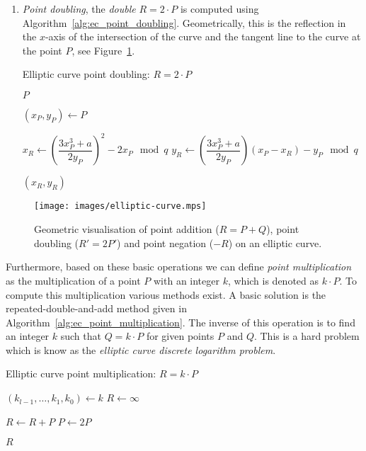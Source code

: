 \begin{enumerate}
  \item \emph{Point doubling}, the \emph{double} $R = 2 \cdot P$ is computed
    using Algorithm~\ref{alg:ec_point_doubling}. Geometrically, this is the
    reflection in the $x$-axis of the intersection of the curve and the tangent
    line to the curve at the point $P$, see Figure~\ref{fig:EC}.
    \begin{algorithm}
      \caption{Elliptic curve point doubling: $R = 2 \cdot P$}
      \label{alg:ec_point_doubling}

      \begin{algorithmic}[1]
            \Return $P$
          \EndIf

          \State $(x_P, y_P) \gets P$

          \State $x_R \gets \left(\dfrac{3 x_P^3 + a}{2 y_P}\right)^2 - 2 x_P \mod q$
          \State $y_R \gets \left(\dfrac{3 x_P^3 + a}{2 y_P}\right) (x_P - x_R) - y_P \mod q$

          \Return $(x_R, y_R)$
        \EndFunction
      \end{algorithmic}
    \end{algorithm}
\end{enumerate}

\begin{figure}[t]
  \centering
  \texttt{[image: images/elliptic-curve.mps]}
  \caption[Geometric visualisation of point operations on an elliptic curve.]{
    Geometric visualisation of point addition ($R = P + Q$), point doubling
    ($R' = 2P'$) and point negation ($-R$) on an elliptic curve.}
  \label{fig:EC}
\end{figure}

Furthermore, based on these basic operations we can define \emph{point
multiplication} as the multiplication of a point $P$ with an integer $k$, which
is denoted as $k \cdot P$. To compute this multiplication various methods exist.
A basic solution is the repeated-double-and-add method given in
Algorithm~\ref{alg:ec_point_multiplication}. The inverse of this operation is to
find an integer $k$ such that $Q = k \cdot P$ for given points $P$ and $Q$. This
is a hard problem which is know as the \emph{elliptic curve discrete logarithm
problem}.

\begin{algorithm}
  \caption{Elliptic curve point multiplication: $R = k \cdot P$}%
  \label{alg:ec_point_multiplication}

  \begin{algorithmic}[1]
      \State $(k_{l-1}, \dots, k_1, k_0) \gets k$ 
      \State $R \gets \infty$

          \State $R \gets R + P$
        \EndIf
        \State $P \gets 2P$
      \EndFor

      \Return $R$
    \EndFunction
  \end{algorithmic}
\end{algorithm}

